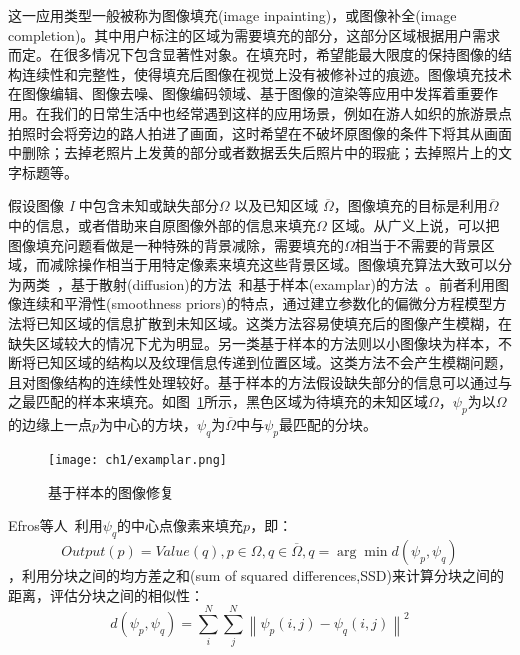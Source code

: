 这一应用类型一般被称为图像填充(image inpainting)，或图像补全(image completion)。其中用户标注的区域为需要填充的部分，这部分区域根据用户需求而定。在很多情况下包含显著性对象。在填充时，希望能最大限度的保持图像的结构连续性和完整性，使得填充后图像在视觉上没有被修补过的痕迹。图像填充技术在图像编辑、图像去噪、图像编码领域、基于图像的渲染等应用中发挥着重要作用。在我们的日常生活中也经常遇到这样的应用场景，例如在游人如织的旅游景点拍照时会将旁边的路人拍进了画面，这时希望在不破坏原图像的条件下将其从画面中删除；去掉老照片上发黄的部分或者数据丢失后照片中的瑕疵；去掉照片上的文字标题等。\par
假设图像 \emph{I} 中包含未知或缺失部分\(\Omega\) 以及已知区域 \(\overline{\Omega}\)，图像填充的目标是利用\(\overline{\Omega}\)中的信息，或者借助来自原图像外部的信息来填充\(\Omega\) 区域。从广义上说，可以把图像填充问题看做是一种特殊的背景减除，需要填充的\(\Omega\)相当于不需要的背景区域，而减除操作相当于用特定像素来填充这些背景区域。图像填充算法大致可以分为两类~\cite{inpaintingSurvey}，基于散射(diffusion)的方法~\cite{Bertalmio:2000}和基于样本(examplar)的方法~\cite{Criminisi04regionfilling}。前者利用图像连续和平滑性(smoothness priors)的特点，通过建立参数化的偏微分方程模型方法将已知区域的信息扩散到未知区域。这类方法容易使填充后的图像产生模糊，在缺失区域较大的情况下尤为明显。另一类基于样本的方法则以小图像块为样本，不断将已知区域的结构以及纹理信息传递到位置区域。这类方法不会产生模糊问题，且对图像结构的连续性处理较好。基于样本的方法假设缺失部分的信息可以通过与之最匹配的样本来填充。如图~\ref{fig:examplar}所示，黑色区域为待填充的未知区域\(\Omega\)，$\psi_{p}$为以\(\Omega\)的边缘上一点$p$为中心的方块，$\psi_{q}$为\(\overline{\Omega}\)中与$\psi_{p}$最匹配的分块。
\begin{figure}[ht]
  \centering%
      {\texttt{[image: ch1/examplar.png]}}
  \caption{基于样本的图像修复}
  \label{fig:examplar}
\end{figure}
Efros等人~\cite{Efros}利用$\psi_{q}$的中心点像素来填充$p$，即：
$$Output(p)=Value(q),p\in \Omega, q\in \overline{\Omega},q=\arg \min d(\psi_{p},\psi_{q})$$
，利用分块之间的均方差之和(sum of squared differences,SSD)来计算分块之间的距离，评估分块之间的相似性：
$$d(\psi_{p},\psi_{q})=\sum_{i}^{N}\sum_{j}^{N}\left \| \psi_{p}(i,j)-\psi_{q}(i,j) \right \|^{2}$$
